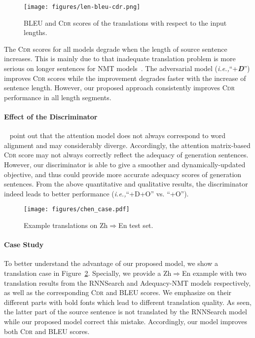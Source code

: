 \documentclass[letterpaper]{article} \usepackage{aaai19}  \usepackage{times}  \usepackage{helvet}  \usepackage{courier}  \usepackage{url}  \usepackage{graphicx}  \frenchspacing  \setlength{\pdfpagewidth}{8.5in}  \setlength{\pdfpageheight}{11in}  \usepackage{amsmath}
\begin{document}
\begin{figure}[t]
\centering
    \texttt{[image: figures/len-bleu-cdr.png]}
    \caption{BLEU and \textsc{Cdr} scores of the translations with respect to the input lengths.}
    \label{figure-sentence-len}
\end{figure}

The \textsc{Cdr} scores for all models degrade when the length of source sentence increases. This is mainly due to that inadequate translation problem is more serious on longer sentences for NMT models~\cite{tu2016modeling}. The adversarial model (\emph{i.e.,}\xspace ``+{\bf \em D}'') improves \textsc{Cdr} scores while the improvement degrades faster with the increase of sentence length. However, our proposed approach consistently improves \textsc{Cdr} performance in all length segments.


\paragraph{Effect of the Discriminator}
\citeauthor{koehn2017six}~ point out that the attention model does not always correspond to word alignment and may considerably diverge. Accordingly, the attention matrix-based \textsc{Cdr} score  may not always correctly reflect the adequacy of generation sentences. However, our discriminator is able to give a smoother and dynamically-updated objective, and thus could provide more accurate adequacy scores of generation sentences. From the above quantitative and qualitative results, the discriminator indeed leads to better performance (\emph{i.e.,}\xspace ``+D+O'' vs. ``+O'').


\begin{figure}[t]
    \centering
    \texttt{[image: figures/chen\_case.pdf]}
    \caption{Example translations on Zh$\Rightarrow$En test set.}
    \label{tab:case}
\end{figure}


\paragraph{Case Study}
To better understand the advantage of our proposed model, we show a translation case in Figure~\ref{tab:case}. Specially, we provide a Zh$\Rightarrow$En example with two translation results from the RNNSearch and Adequacy-NMT models respectively, as well as the corresponding \textsc{Cdr} and BLEU scores. We emphasize on their different parts with bold fonts which lead to different translation quality.
As seen, the latter part of the source sentence is not translated by the RNNSearch model while our proposed model correct this mistake. Accordingly, our model improves both \textsc{Cdr} and BLEU scores.
\end{document}
